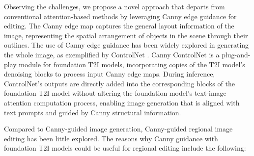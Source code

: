 \documentclass{article}
\begin{document}




Observing the challenges, we propose a novel approach that departs from conventional attention-based methods by leveraging Canny edge guidance for editing. The Canny edge map \citep{Canny1986computational} captures the general layout information of the image, representing the spatial arrangement of objects in the scene through their outlines. The use of Canny edge guidance has been widely explored in generating the whole image, as exemplified by ControlNet \citep{zhang2023adding}. Canny ControlNet is a plug-and-play module for foundation T2I models, incorporating copies of the T2I model's denoising blocks to process input Canny edge maps. During inference, ControlNet's outputs are directly added into the corresponding blocks of the foundation T2I model without altering the foundation model's text-image attention computation process, enabling image generation that is aligned with text prompts and guided by Canny structural information.


Compared to Canny-guided image generation, Canny-guided regional image editing has been little explored. The reasons why Canny guidance with foundation T2I models could be useful for regional editing include the following:
\end{document}
